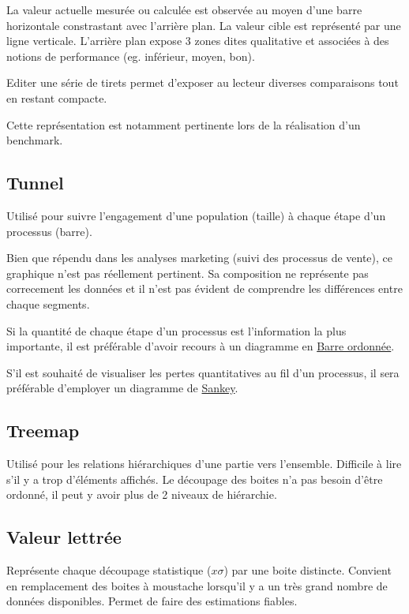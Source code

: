 \documentclass[a4paper,12pt]{article}
\begin{document}
\begin{multicols}{2}
La valeur actuelle mesurée ou calculée est observée au moyen d'une barre horizontale constrastant avec l'arrière plan. \autocite{jonathanschwabishComparingCategories2021}
La valeur cible est représenté par une ligne verticale. \autocite{alansmithLexiqueVisuel}
L'arrière plan expose 3 zones dites qualitative et associées à des notions de performance (eg. inférieur, moyen, bon). \autocite{sosulskiGraphics2019}

Editer une série de tirets permet d'exposer au lecteur diverses comparaisons tout en restant compacte. \autocite{jonathanschwabishComparingCategories2021}

Cette représentation est notamment pertinente lors de la réalisation d'un benchmark. \autocite{mikeyiHowChooseRight2020}
\subsection*{Tunnel}
\label{sec:org74a1214}
Utilisé pour suivre l'engagement d'une population (taille) à chaque étape d'un processus (barre). \autocite{mikeyiHowChooseRight2020}

Bien que répendu dans les analyses marketing (suivi des processus de vente), ce graphique n'est pas réellement pertinent. Sa composition ne représente pas correcement les données et il n'est pas évident de comprendre les différences entre chaque segments.\autocite{stephenfewSillyGraphsThat2012}

Si la quantité de chaque étape d'un processus est l'information la plus importante, il est préférable d'avoir recours à un diagramme en \hyperref[sec:orga4bd1f2]{Barre ordonnée}.

S'il est  souhaité de visualiser les pertes quantitatives au fil d'un processus, il sera préférable d'employer un diagramme de \hyperref[sec:orgcabbaaf]{Sankey}.
\subsection*{Treemap}
\label{sec:org272f67c}
Utilisé pour les relations hiérarchiques d'une partie vers l'ensemble. Difficile à lire s'il y a trop d'éléments affichés. \autocite{alansmithLexiqueVisuel}
Le découpage des boites n'a pas besoin d'être ordonné, il peut y avoir plus de 2 niveaux de hiérarchie. \autocite{mikeyiHowChooseRight2020}
\subsection*{Valeur lettrée}
\label{sec:org2713ead}
Représente chaque découpage statistique (\(x\sigma\)) par une boite distincte. Convient en remplacement des boites à moustache lorsqu'il y a un très grand nombre de données disponibles. Permet de faire des estimations fiables. \autocite{hofmannLettervaluePlotsBoxplots2017,mikeyiHowChooseRight2020}

\end{multicols}
\end{document}
